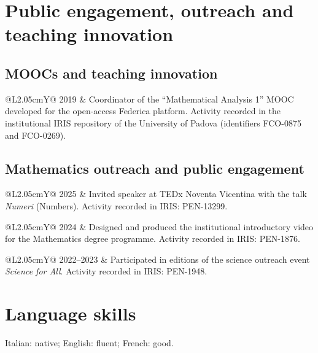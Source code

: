 \documentclass[10pt,a4paper]{article}
\makeatletter
\newcommand{\yearrow}[2]{%
  \begin{tabularx}{\textwidth}{@{}L{2.05cm}Y@{}}
    \textcolor{muted}{#1} & #2
  \end{tabularx}\vspace{1pt}
}
\makeatother
\begin{document}
\newpage

\section{Public engagement, outreach and teaching innovation}

\subsection{MOOCs and teaching innovation}
\yearrow{2019}{{Coordinator of the ``Mathematical Analysis 1'' MOOC} developed for the open-access Federica platform.
Activity recorded in the institutional IRIS repository
of the University of Padova (identifiers FCO-0875 and FCO-0269).}

\subsection{Mathematics outreach and public engagement}

\yearrow{2025}{Invited speaker at TEDx Noventa Vicentina with the talk \emph{Numeri} (Numbers). Activity recorded in IRIS: PEN-13299.}
\yearrow{2024}{Designed and produced the institutional introductory video for the Mathematics degree programme. Activity recorded in IRIS: PEN-1876.}
\yearrow{2022--2023}{Participated in editions of the science outreach event \emph{Science for All}. Activity recorded in IRIS: PEN-1948.}

\section{Language skills}

Italian: native; English: fluent; French: good.
%
%
\end{document}
